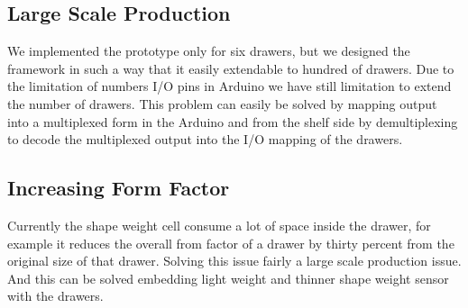 \subsection{Large Scale Production}
We implemented the prototype only for six drawers, but we designed the framework in such a way that it easily extendable to hundred of drawers. Due to the limitation of numbers I/O pins in Arduino we have still limitation to extend the number of drawers. This problem can easily be solved by mapping output into a multiplexed form in the Arduino and from the shelf side by demultiplexing to decode the multiplexed output into the I/O mapping of the drawers. 
\subsection{Increasing Form Factor}
Currently the shape weight cell consume a lot of space inside the drawer, for example it reduces the overall from factor of a drawer by thirty percent from the original size of that drawer. Solving this issue fairly a large scale production issue. And this can be solved embedding light weight and thinner shape weight sensor with the drawers.